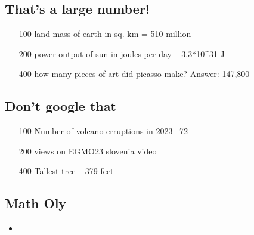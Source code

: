 \documentclass[12pt]{article}
\begin{document}
\eject
\subsection*{That's a large number!}
\begin{itemize}
    \item [100] land mass of earth in sq. km = 510 million
    \item [200] power output of sun in joules per day ~ 3.3*10^31 J
    \item [400] how many pieces of art did picasso make? Answer: 147,800
\end{itemize}

\subsection*{Don't google that}
\begin{enumerate}
    \item [100] Number of volcano erruptions in 2023 ~72
    \item [200] views on EGMO23 slovenia video
    \item [400] Tallest tree ~ 379 feet
\end{enumerate}

\subsection*{Math Oly}
\begin{itemize}
    \item 
\end{itemize}
\end{document}
